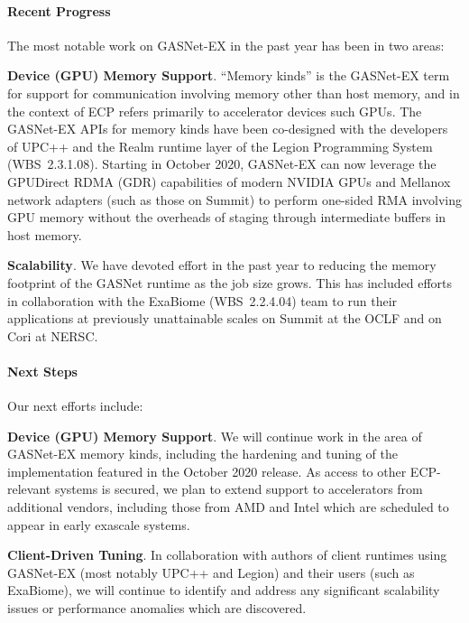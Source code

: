 \paragraph{Recent Progress}

The most notable work on GASNet-EX in the past year has been in two areas:

\textbf{Device (GPU) Memory Support}.
``Memory kinds'' is the GASNet-EX term for support for communication involving
memory other than host memory, and in the context of ECP refers primarily to
accelerator devices such GPUs.
The GASNet-EX APIs for memory kinds have been co-designed with the developers
of UPC++ and the Realm runtime layer of the Legion Programming System
(WBS~2.3.1.08).  
Starting in October 2020, GASNet-EX can now leverage the GPUDirect RDMA (GDR)
capabilities of modern NVIDIA GPUs and Mellanox network adapters (such as those
on Summit) to perform one-sided RMA involving GPU memory without
the overheads of staging through intermediate buffers in host memory.

\textbf{Scalability}.
We have devoted effort in the past year to reducing the memory footprint of the
GASNet runtime as the job size grows.  This has included efforts in
collaboration with the ExaBiome (WBS~2.2.4.04) team to run their applications
at previously unattainable scales on Summit at the OCLF and on Cori at NERSC.

\paragraph{Next Steps}

Our next efforts include:

\textbf{Device (GPU) Memory Support}.
We will continue work in the area of GASNet-EX memory kinds, including the
hardening and tuning of the implementation featured in the October 2020
release.  As access to other ECP-relevant systems is secured, we plan to extend
support to accelerators from additional vendors, including those from AMD and
Intel which are scheduled to appear in early exascale systems.

\textbf{Client-Driven Tuning}.
In collaboration with authors of client runtimes using GASNet-EX (most notably
UPC++ and Legion) and their users (such as ExaBiome), we will continue to
identify and address any significant scalability issues or performance
anomalies which are discovered.

\clearpage
